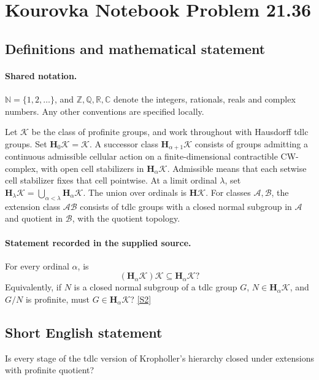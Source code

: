 \documentclass[11pt]{article}
\newcommand{\sref}[2]{\hyperlink{source:#1:#2}{[S#2]}}
\begin{document}
\section{Kourovka Notebook Problem 21.36}\label{statement}

\subsection{Definitions and mathematical statement}

\paragraph{Shared notation.}$\mathbb N=\{1,2,\ldots\}$, and $\mathbb Z,\mathbb Q,\mathbb R,\mathbb C$ denote the integers, rationals, reals and complex numbers. Any other conventions are specified locally.


Let $\mathcal K$ be the class of profinite groups, and work throughout with Hausdorff tdlc groups. Set $\mathbf H_0\mathcal K=\mathcal K$. A successor class $\mathbf H_{\alpha+1}\mathcal K$ consists of groups admitting a continuous admissible cellular action on a finite-dimensional contractible CW-complex, with open cell stabilizers in $\mathbf H_\alpha\mathcal K$. Admissible means that each setwise cell stabilizer fixes that cell pointwise. At a limit ordinal $\lambda$, set $\mathbf H_\lambda\mathcal K=\bigcup_{\alpha<\lambda}\mathbf H_\alpha\mathcal K$. The union over ordinals is $\mathbf H\mathcal K$. For classes $\mathcal A,\mathcal B$, the extension class $\mathcal A\mathcal B$ consists of tdlc groups with a closed normal subgroup in $\mathcal A$ and quotient in $\mathcal B$, with the quotient topology.
\paragraph{Statement recorded in the supplied source.}
For every ordinal $\alpha$, is
\[
 (\mathbf H_\alpha\mathcal K)\mathcal K\subseteq\mathbf H_\alpha\mathcal K?
\]
Equivalently, if $N$ is a closed normal subgroup of a tdlc group $G$, $N\in\mathbf H_\alpha\mathcal K$, and $G/N$ is profinite, must $G\in\mathbf H_\alpha\mathcal K$? \sref{statement}{2}
\subsection{Short English statement}
Is every stage of the tdlc version of Kropholler’s hierarchy closed under extensions with profinite quotient?
\end{document}
